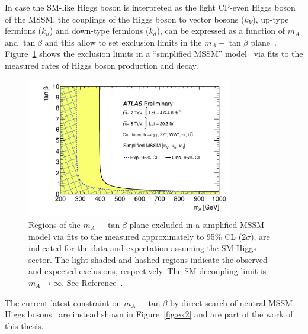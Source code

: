 In case the SM-like Higgs boson is interpreted as the light CP-even Higgs boson of the MSSM, the couplings of the Higgs boson 
to vector bosons ($k_V$), up-type fermions ($k_u$) and down-type fermions ($k_d$), can be expressed as a function of  $m_A $ and $\tan\beta$ 
and this allow to set exclusion limits in the $m_A - \tan\beta$ plane~\cite{AtlasConstraint}. Figure~\ref{fig:ex1} shows the exclusion limits in a 
``simplified MSSM'' model~\cite{sympleMSSM1,sympleMSSM2} via fits to the measured rates of Higgs boson production and decay.

 
\begin{figure}[tp]
     \begin{center}

            \includegraphics[width=0.8\textwidth]{figure/limits/constraintAtlas.pdf}

    \end{center}
    \caption{Regions of the  $m_A - \tan\beta$ plane excluded in a simplified MSSM model via fits to the measured
approximately to 95\% CL ($2\sigma$), are indicated for the data and expectation assuming the SM Higgs sector.
The light shaded and hashed regions indicate the observed and expected exclusions, respectively. The
SM decoupling limit is $m_A \rightarrow \infty$. See Reference~\cite{AtlasConstraint}.}

   \label{fig:ex1}
\end{figure}


The current latest constraint on $m_A - \tan\beta$  by direct search of neutral MSSM Higgs bosons~\cite{} are instead shown in Figure~\ref{fig:ex2}
and are part of the work of this thesis.



